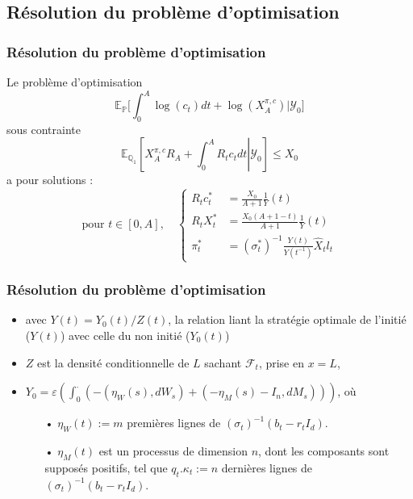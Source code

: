 \documentclass{beamer}
\begin{document}
\subsection{Résolution du problème d'optimisation}
\begin{frame}
\frametitle{Résolution du problème d'optimisation}
Le problème d'optimisation 
\begin{equation*}
\mathbb{E}_{\mathbb{P}} \Big[ \displaystyle \int_{0}^{A} \log (c_t)dt + \log(X_A^{\pi, c})\Big |\mathcal{Y}_0\Big]
\end{equation*}
sous contrainte 
\begin{equation*}
\mathbb{E}_{\mathbb{Q}_1} \left[ X_A^{\pi, c} R_A + \int_0^A R_t c_t dt \left\vert\right. \mathcal{Y}_0 \right] \leq X_0
\end{equation*}
a pour solutions : 
\begin{displaymath}
\text{pour } t \in [0, A], \quad \begin{cases}
 R_t {c}_t^* &= \frac{X_0}{A+1} \frac{1}{Y}(t)\\
 R_t {X}_t^* &= \frac{X_0(A+1-t)}{A+1}\frac{1}{Y}(t)\\
 {\pi}_t^* &= (\sigma^*_t)^{-1}\frac{Y(t)}{Y(t^{-1})}\widehat{X}_t l_t
\end{cases}
\end{displaymath}
\end{frame}

\begin{frame}
\frametitle{Résolution du problème d'optimisation}
\begin{itemize}
\item avec $Y(t) = Y_0(t) / Z(t)$, la relation liant la stratégie optimale de l'initié ($Y(t)$) avec celle du non initié ($Y_0(t)$)\\
\item $Z$ est la densité conditionnelle de $L$ sachant $\mathcal{F}_t$, prise en $x = L$,
\item $Y_0 = \varepsilon \left(\displaystyle \int_{0}^{\cdot} \left(- \left( \eta_W \left( s \right), dW_s \right) + \left( - \eta_M \left(  s \right) - I_n, dM_s \right) \right)\right)$, où
\begin{itemize}
\item[•] $\eta_W \left( t \right) := m$ premières lignes de $(\sigma_t)^{-1}(b_t - r_t I_d)$.\
\item[•] $ \eta_M \left( t \right)$ est un processus de dimension $n$, dont les composants sont supposés positifs, tel que $q_t. \kappa_t := n$ dernières lignes de $(\sigma_t)^{-1}(b_t - r_t I_d)$.
\end{itemize}
\end{itemize}
\end{frame}
\end{document}
